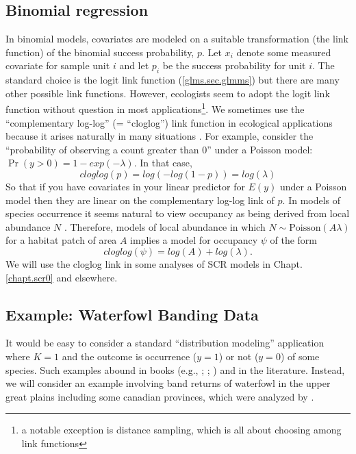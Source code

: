 \subsection{Binomial regression}

In binomial models, covariates are modeled on a suitable
transformation (the link function) of the binomial success
probability, $p$.  Let $x_{i}$ denote some measured covariate for
sample unit $i$ and let $p_{i}$ be the success probability for unit $i$.
The standard choice is the logit link function (\ref{glms.sec.glmms}) but there are many other possible link functions. However, ecologists seem
to adopt the logit link function without question in most
applications\footnote{a notable exception is distance sampling, which
  is all about choosing among link functions}.  We sometimes use the
``complementary log-log'' (= ``cloglog'') link function in ecological
applications because it arises naturally in many situations
\citep[][p. 150]{royle_dorazio:2008}. For example, consider the
``probability of observing a count greater than 0'' under a Poisson
model: $\Pr(y>0) = 1-exp(- \lambda)$. In that case,
\[
cloglog(p) =log(- log(1-p)) = log(\lambda)
\]
So that if you have covariates in your linear predictor for $E(y)$
under a Poisson model then they are linear on the complementary
log-log link of $p$.
In models of species occurrence it seems natural to view occupancy as
being derived from local abundance $N$
\citep{royle_nichols:2003,royle_dorazio:2006,dorazio:2007}.
Therefore,
models of local abundance in which $N \sim \mbox{Poisson}(A \lambda)$
for a habitat patch of area $A$ implies a model for occupancy $\psi$
of the form
\[
 cloglog(\psi) = log(A) + log(\lambda).
\]
We will use the cloglog link in some analyses of
SCR models in Chapt. \ref{chapt.scr0} and elsewhere.


\subsection{ Example: Waterfowl Banding Data}

It would be easy to consider a standard ``distribution modeling''
application where $K=1$ and the outcome is occurrence ($y=1$) or not
($y=0$) of some species. Such examples abound in books (e.g.,
\citet[][ch. 3]{royle_dorazio:2008}; \citet[][ch. 21]{kery:2010};
\citet[][ch. 13]{kery_schaub:2011}) and in the literature.
Instead, we will
consider an example involving band returns of waterfowl in the upper great plains including some canadian provinces, which were
analyzed by \citet{royle_dubovsky:2001}.

